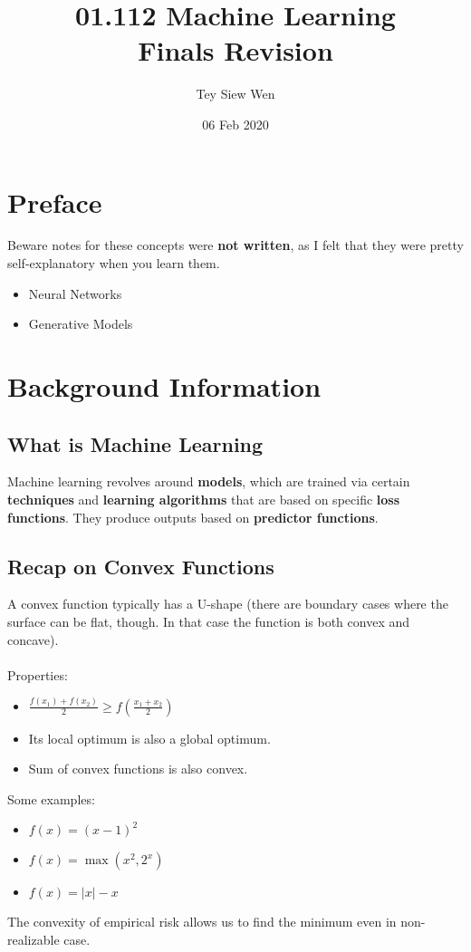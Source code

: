 \documentclass[a4paper]{article}
\title{01.112 Machine Learning\\Finals Revision}
\author{Tey Siew Wen}
\date{06 Feb 2020}
\begin{document}
	
\maketitle

\section*{Preface}
Beware notes for these concepts were \textbf{not written}, as I felt that they were pretty self-explanatory when you learn them.

\begin{itemize}
	\item Neural Networks
	\item Generative Models
\end{itemize}

\tableofcontents
\newpage
\section{Background Information}
\subsection{What is Machine Learning}
Machine learning revolves around \textbf{models}, which are trained via certain \textbf{techniques} and \textbf{learning algorithms} that are based on specific \textbf{loss functions}. They produce outputs based on \textbf{predictor functions}.
\subsection{Recap on Convex Functions}
A convex function typically has a U-shape (there are boundary cases where the surface can be flat, though. In that case the function is both convex and concave).\\
\\
\noindent Properties:
\begin{itemize}
	\item $\displaystyle \frac{f(x_1)+f(x_2)}{2} \geq f\left(\frac{x_1+x_2}{2}\right)$
	\item Its local optimum is also a global optimum.
	\item Sum of convex functions is also convex.
\end{itemize}
\noindent Some examples:
\begin{itemize}
	\item $f(x) = (x-1)^2 $
	\item $f(x) = \max(x^2, 2^x)$
	\item $f(x) = |x| - x$
\end{itemize}
\noindent The convexity of empirical risk allows us to find the minimum even in non-realizable case.
\end{document}
